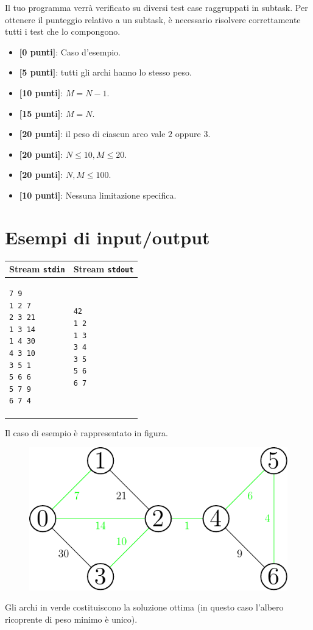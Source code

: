 \documentclass[a4paper,11pt]{article}
\begin{document}
Il tuo programma verrà verificato su diversi test case raggruppati in subtask.
Per ottenere il punteggio relativo a un subtask, è necessario risolvere correttamente tutti i test che lo compongono.

\begin{itemize}
  \item \textbf{ [0 punti]}: Caso d'esempio.
  \item \textbf{ [5 punti]}: tutti gli archi hanno lo stesso peso.
  \item \textbf{ [10 punti]}: $M=N-1$.
  \item \textbf{ [15 punti]}: $M=N$.
  \item \textbf{ [20 punti]}: il peso di ciascun arco vale $2$ oppure $3$.
  \item \textbf{ [20 punti]}: $N\leq 10, M\leq 20$.
  \item \textbf{ [20 punti]}: $N, M\leq 100$.
  \item \textbf{ [10 punti]}: Nessuna limitazione specifica.
\end{itemize}

  
\section*{Esempi di input/output}

  
    \noindent
    \begin{tabular}{p{11cm}|p{5cm}}
    \toprule
    \textbf{Stream \texttt{stdin}}
    & \textbf{Stream \texttt{stdout}}
    \\
    \midrule
    \scriptsize
    \begin{verbatim}
7 9
1 2 7
2 3 21
1 3 14
1 4 30
4 3 10
3 5 1
5 6 6
5 7 9
6 7 4
    \end{verbatim}
    &
    \scriptsize
    \begin{verbatim}
42
1 2
1 3
3 4
3 5
5 6
6 7
    \end{verbatim}
    \\
    \bottomrule
    \end{tabular}

\bigskip
    
Il caso di esempio è rappresentato in figura.
\begin{figure}[ht]
	\centering
	\includegraphics[scale = 0.8]{asy_mst/mst.pdf}
\end{figure}

Gli archi in verde costituiscono la soluzione ottima (in questo caso l'albero ricoprente di peso minimo è unico).
\end{document}
